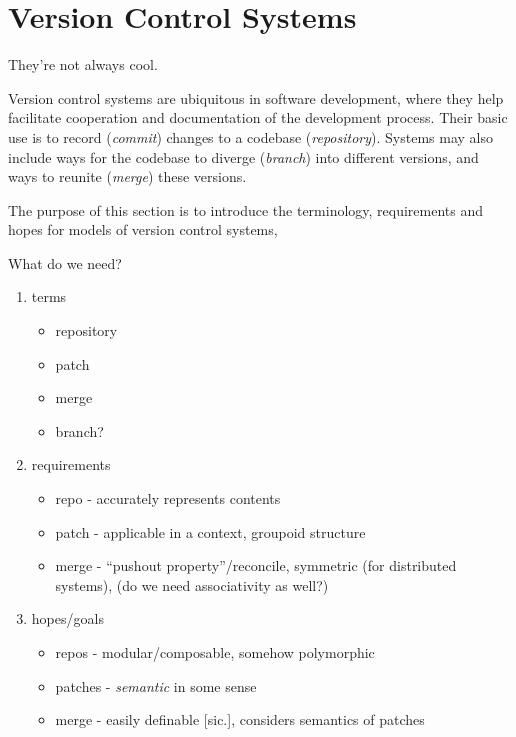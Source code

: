 \chapter{Version Control Systems}
They're not always cool.~\cite{git-inconsistent}

Version control systems are ubiquitous in software development, where they
help facilitate cooperation and documentation of
the development process. Their basic use is to record (\emph{commit}) changes
to a codebase (\emph{repository}). Systems may also include ways for the
codebase to diverge (\emph{branch}) into different versions, and ways to
reunite (\emph{merge}) these versions.

The purpose of this section is to introduce the terminology, requirements and
hopes for models of version control systems,

What do we need?
\begin{enumerate}
\item terms
  \begin{itemize}
  \item repository
  \item patch
  \item merge
  \item branch?
  \end{itemize}
\item requirements
  \begin{itemize}
  \item repo - accurately represents contents
  \item patch - applicable in a context, groupoid structure
  \item merge - ``pushout property''/reconcile, symmetric (for distributed
    systems), (do we need associativity as well?)
  \end{itemize}
\item hopes/goals
  \begin{itemize}
  \item repos - modular/composable, somehow polymorphic
  \item patches - \emph{semantic} in some sense
  \item merge - easily definable [sic.], considers semantics of patches
  \end{itemize}
\end{enumerate}